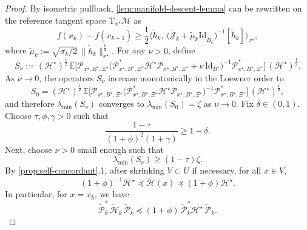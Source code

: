 \documentclass[final,onefignum,onetabnum]{siamart250211}
\begin{document}
\begin{proof}
By isometric pullback, \cref{lem:manifold-descent-lemma} can be rewritten on the reference tangent space $\mathrm{T}_{x^\star}\mathcal{M}$ as
\begin{equation}
f(x_k)-f(x_{k+1})
\ge
\frac{1}{2}
\Big\langle
\widetilde h_k,\
\bigl(\widetilde{\mathcal J}_k+\tilde{\mu}_k\mathrm{Id}_{\widetilde B_k}\bigr)^{-1}[\widetilde h_k]
\Big\rangle_{x^\star},
\label{eq:descent-pulledback}
\end{equation}
where
$
\tilde{\mu}_k
:=
\sqrt{\sigma_k/2}\,\|\widetilde h_k\|_{x^\star}^{\frac{1}{2}}.
$
For any $\nu>0$, define
\[
S_{\nu}
:=
(\mathcal{H}^\star)^{\frac{1}{2}}\,
\mathbb E\Big[
\mathcal P_{x^\star,B^\star,\Xi^\star}
\bigl(
\mathcal P_{x^\star,B^\star,\Xi^\star}^{*}\mathcal{H}^\star\mathcal P_{x^\star,B^\star,\Xi^\star}
+\nu\,\mathrm{Id}_{B^\star}
\bigr)^{-1}
\mathcal P_{x^\star,B^\star,\Xi^\star}^{*}
\Big]\,
(\mathcal{H}^\star)^{\frac{1}{2}}.
\]
As $\nu\to 0$, the operators $S_{\nu}$ increase monotonically in the Loewner order to
\[
S_0
=
(\mathcal{H}^\star)^{\frac{1}{2}}\,
\mathbb E\Big[
\mathcal P_{x^\star,B^\star,\Xi^\star}
\bigl(
\mathcal P_{x^\star,B^\star,\Xi^\star}^{*}\mathcal{H}^\star\mathcal P_{x^\star,B^\star,\Xi^\star}
\bigr)^{-1}
\mathcal P_{x^\star,B^\star,\Xi^\star}^{*}
\Big]\,
(\mathcal{H}^\star)^{\frac{1}{2}},
\]
and therefore $\lambda_{\min}(S_{\nu})$ converges to $\lambda_{\min}(S_0)=\zeta$ as $\nu \to 0$.
Fix $\delta\in(0,1)$. Choose $\tau,\phi,\gamma>0$ such that
\begin{equation}
\frac{1-\tau}{(1+\phi)^2(1+\gamma)}\ge 1-\delta.
\label{eq:local-parameter-choice}
\end{equation}
Next, choose $\nu>0$ small enough such that
\begin{equation}
\lambda_{\min}(S_{\nu})\ge (1-\tau)\zeta.
\label{eq:Smu-close-to-zeta}
\end{equation}
By \cref{prop:self-concordant}.1, after shrinking $V\subset U$ if necessary, for all $x\in V$,
\begin{equation}
(1+\phi)^{-1}\mathcal{H}^\star
\preceq
\widetilde{\mathcal H}(x)
\preceq
(1+\phi)\mathcal{H}^\star.
\label{eq:Hessian-comparison-pulledback}
\end{equation}
In particular, for $x=x_k$, we have
\begin{equation}
\widetilde{\mathcal P}_k^*\,\widetilde{\mathcal H}_k\,\widetilde{\mathcal P}_k
\preceq
(1+\phi)\,\widetilde{\mathcal P}_k^*\mathcal{H}^\star\,\widetilde{\mathcal P}_k.
\label{eq:reduced-Hessian-comparison}
\end{equation}

\end{proof}
\end{document}
